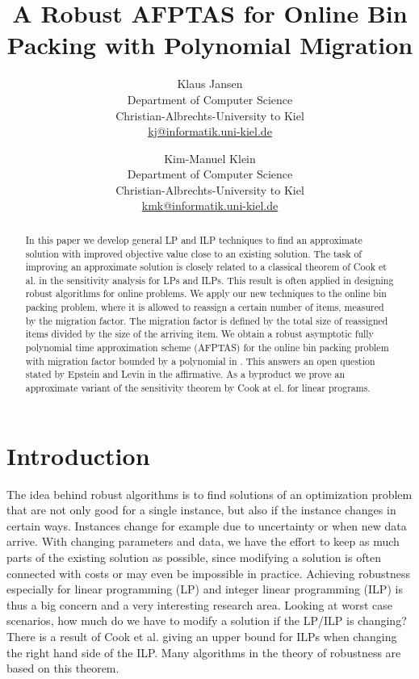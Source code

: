 \documentclass[a4paper,11pt]{article}
\title{A Robust AFPTAS for Online Bin Packing with Polynomial Migration}
\author{Klaus Jansen\\
Department of Computer Science\\
Christian-Albrechts-University to Kiel\\\url{ kj@informatik.uni-kiel.de}
 \and 
Kim-Manuel Klein\\
Department of Computer Science\\
Christian-Albrechts-University to Kiel\\
\url{ kmk@informatik.uni-kiel.de}}
\date{}
\begin{document}
\maketitle

\begin{abstract}
In this paper we develop general LP and ILP techniques to find an approximate solution with improved objective
value close to an existing solution.
The task of improving an approximate solution is closely related to a classical theorem of 
Cook et al. \cite{cook1986sensitivity} in the
sensitivity analysis for LPs and ILPs. This result is often applied in designing robust algorithms for online
problems.
We apply our new techniques to the online bin packing problem, where it is allowed to reassign a certain
number of items, measured by the migration factor. The migration factor is defined by
the total size of reassigned items divided by the size of the arriving item.
We obtain a robust asymptotic fully polynomial time approximation scheme (AFPTAS) for the online bin packing
problem with migration 
factor bounded by a polynomial in .
This answers an open question stated by Epstein and Levin \cite{epstein2006robust} in the affirmative.
As a byproduct we prove an approximate variant of the sensitivity
theorem by Cook at el. \cite{cook1986sensitivity} for linear programs.
\end{abstract}


\section{Introduction}
The idea behind robust algorithms is to find solutions of an optimization problem 
that are not only good for a single instance, but also if the instance changes in 
certain ways. Instances change for example due to uncertainty or when new data
arrive. With changing parameters and data, we have the effort to keep as much 
parts of the existing solution as possible, since modifying a solution is often
connected with costs or may even be impossible in practice.
Achieving robustness especially for linear programming (LP) and integer linear programming (ILP)
is thus a big concern and a very interesting research area. Looking at worst case scenarios, how
much do we have to modify a solution if the LP/ILP is changing? There is a result of Cook et al. \cite{cook1986sensitivity}
giving an upper bound for ILPs when changing the right hand side of the ILP.
Many algorithms in the theory of robustness are based on this theorem.
\end{document}
